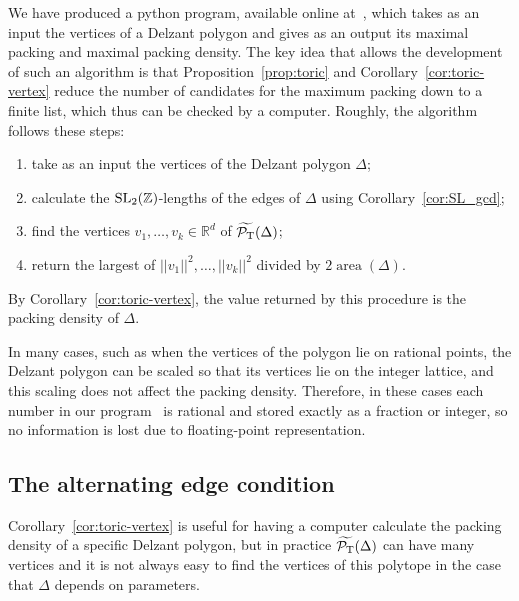 \documentclass[10pt,a4paper]{amsart}
\numberwithin{equation}{section}
\def\R{{\mathbb R}}
\def\Z{{\mathbb Z}}
\newcommand{\De}{\Delta}
\newcommand{\area}{\operatorname{area}}
\newcommand{\PT}{\mathcal{P}_{\rm T}}
\newcommand{\PTtilde}{\widetilde{\PT}}
\newcommand{\SL}{{\rm SL}_2(\Z)}
\theoremstyle{definition}
\theoremstyle{plain}
\theoremstyle{plain}
\begin{document}
We have produced a python program, available online at~\cite{alg-url}, which takes as an input the vertices of a Delzant polygon and gives as an output its maximal packing and maximal packing density.
The key idea that allows the development of such an algorithm is that Proposition~\ref{prop:toric} and Corollary~\ref{cor:toric-vertex} reduce the number of candidates for the maximum packing down to a finite list, which thus can be checked by a computer.
Roughly, the algorithm follows these steps:
\begin{enumerate}\itemsep=0pt
 \item[(1)] take as an input the vertices of the Delzant polygon $\De$;
 \item[(2)] calculate the $\SL$-lengths of the edges of $\De$ using Corollary~\ref{cor:SL_gcd};
 \item[(3)] find the vertices $v_1,\ldots,v_k\in\R^d$ of $\PTtilde(\De)$;
 \item[(4)] return the largest of $||v_1||^2,\ldots,||v_k||^2$ divided by $2\area(\De)$.
\end{enumerate}
By Corollary~\ref{cor:toric-vertex}, the value returned by this procedure is the packing density of $\De$.

In many cases, such as when the vertices of the polygon lie on rational points, the Delzant polygon can be scaled so that its vertices lie on the integer lattice, and this scaling does not affect the packing density.
Therefore, in these cases each number in our program~\cite{alg-url} is rational and stored exactly as a fraction or integer, so no information is lost due to floating-point representation.






\subsection{The alternating edge condition}
Corollary~\ref{cor:toric-vertex} is useful for having a computer calculate the packing density of a specific Delzant polygon, but in practice $\PTtilde(\De)$ can have many vertices and it is not always easy to find the vertices of this polytope in the case that $\De$ depends on parameters.
\end{document}
